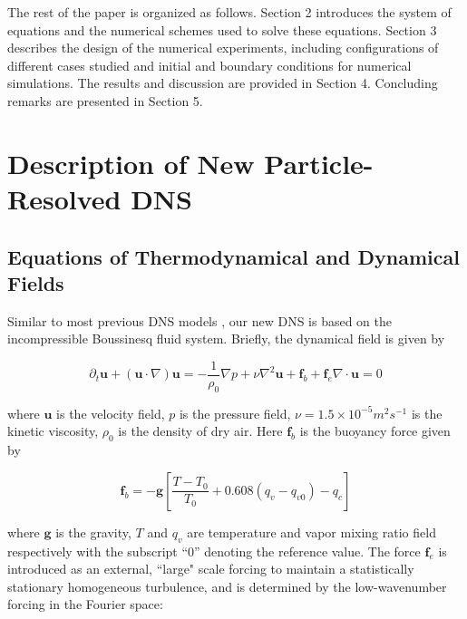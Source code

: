 \documentclass[draft,linenumbers]{AGUJournal}
\begin{document}
The rest of the paper is organized as follows. Section 2 introduces the system of equations and the numerical schemes used to solve these equations. Section 3 describes the design of the numerical experiments, including configurations of different cases studied and initial and boundary conditions for numerical simulations. The results and discussion are provided in Section 4. Concluding remarks are presented in Section 5. 

\section{Description of New Particle-Resolved DNS}\label{particle_dns}

\subsection{Equations of Thermodynamical and Dynamical Fields}

Similar to most previous DNS models \citep[e.g.,][]{And04}, our new DNS is based on the incompressible Boussinesq fluid system. Briefly, the dynamical field is given by

\begin{subequations}

\begin{equation}
\partial_{t}\mathbf{u}+(\mathbf{u}\cdot\nabla)\mathbf{u}=-\frac{1}{\rho_{0}}\nabla p+\nu\nabla^2 \mathbf{u}+\mathbf{f}_b + \mathbf{f}_e\label{eq:NS1}
\end{equation}


\begin{equation}
\nabla\cdot \mathbf{u}=0\label{eq:NS2}
\end{equation}

\end{subequations}

where $\mathbf{u}$ is the velocity field, $p$ is the pressure field, $\nu = 1.5\times 10^{-5}m^2s^{-1}$ is the kinetic viscosity, $\rho_{0}$ is the density of dry air. Here $\mathbf{f}_b$ is the buoyancy force given by 

\begin{equation}
\mathbf{f}_b= 
-\mathbf{g}[\frac{T-T_{0}}{T_0}+0.608(q_{v}-q_{v0})-q_{c}]
\label{eq:source_term}
\end{equation}

where $\mathbf{g}$ is the gravity, $T$ and $q_{v}$ are temperature
and vapor mixing ratio field respectively with the subscript ``$0$''
denoting the reference value. The force $\mathbf{f}_e$ is introduced as an external, ``large" scale forcing to maintain a statistically stationary homogeneous turbulence, and is determined by the low-wavenumber forcing in the Fourier space:
\end{document}
